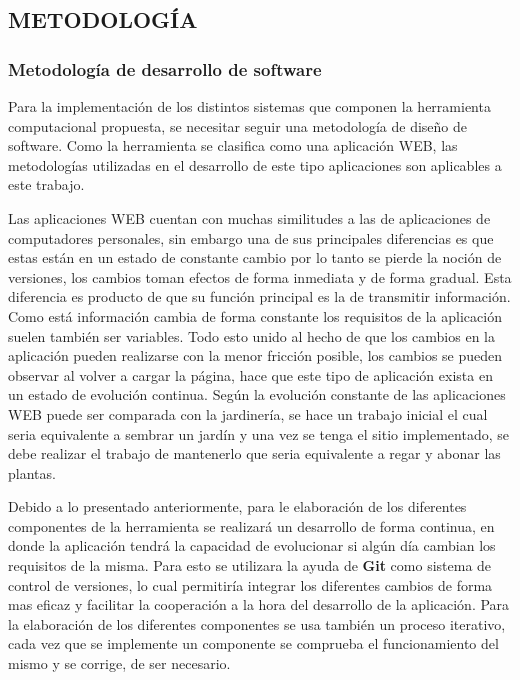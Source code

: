 
\subsection{METODOLOGÍA}
\subsubsection{Metodología de desarrollo de software}

Para la implementación de los distintos sistemas que componen la herramienta
computacional propuesta, se necesitar seguir una metodología de diseño de
software. Como la herramienta se clasifica como una aplicación WEB, las
metodologías utilizadas en el desarrollo de este tipo aplicaciones son
aplicables a este trabajo.

Las aplicaciones WEB cuentan con muchas similitudes a las de aplicaciones de
computadores personales, sin embargo una de sus principales diferencias es que
estas están en un estado de constante cambio por lo tanto
se pierde la noción de versiones, los cambios toman efectos de forma inmediata
y de forma gradual. Esta diferencia es producto de que su función principal es
la de transmitir información. Como está información cambia de forma constante
los requisitos de la aplicación suelen también ser variables. Todo esto unido
al hecho de que los cambios en la aplicación pueden realizarse con la
menor fricción posible, los cambios se pueden observar al volver a cargar la
página, hace que este tipo de aplicación  exista en un estado de evolución
continua. Según \cite{pressman2002} la evolución constante de las aplicaciones
WEB puede ser comparada con la jardinería, se hace un trabajo inicial el cual
seria equivalente a sembrar un jardín y una vez se tenga el sitio implementado,
se debe realizar el trabajo de mantenerlo que seria equivalente a regar y
abonar las plantas.

Debido a lo presentado anteriormente, para le elaboración de los diferentes
componentes de la herramienta se realizará un desarrollo de forma continua,
en donde la aplicación tendrá la capacidad de evolucionar si algún día
cambian los requisitos de la misma. Para esto se utilizara la ayuda de
\textbf{Git} como sistema de control de versiones, lo cual permitiría integrar
los diferentes cambios de forma mas eficaz y facilitar la cooperación a la
hora del desarrollo de la aplicación. Para la elaboración de los diferentes
componentes se usa también un proceso iterativo, cada vez que se implemente
un componente se comprueba el funcionamiento del mismo y se corrige, de ser
necesario.

